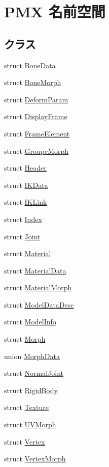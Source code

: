 \hypertarget{namespace_p_m_x}{}\section{P\+MX 名前空間}
\label{namespace_p_m_x}
\subsection*{クラス}
\begin{DoxyCompactItemize}
\item 
struct \mbox{\hyperlink{struct_p_m_x_1_1_bone_data}{Bone\+Data}}
\item 
struct \mbox{\hyperlink{struct_p_m_x_1_1_bone_morph}{Bone\+Morph}}
\item 
struct \mbox{\hyperlink{struct_p_m_x_1_1_deform_param}{Deform\+Param}}
\item 
struct \mbox{\hyperlink{struct_p_m_x_1_1_display_frame}{Display\+Frame}}
\item 
struct \mbox{\hyperlink{struct_p_m_x_1_1_frame_element}{Frame\+Element}}
\item 
struct \mbox{\hyperlink{struct_p_m_x_1_1_groupe_morph}{Groupe\+Morph}}
\item 
struct \mbox{\hyperlink{struct_p_m_x_1_1_header}{Header}}
\item 
struct \mbox{\hyperlink{struct_p_m_x_1_1_i_k_data}{I\+K\+Data}}
\item 
struct \mbox{\hyperlink{struct_p_m_x_1_1_i_k_link}{I\+K\+Link}}
\item 
struct \mbox{\hyperlink{struct_p_m_x_1_1_index}{Index}}
\item 
struct \mbox{\hyperlink{struct_p_m_x_1_1_joint}{Joint}}
\item 
struct \mbox{\hyperlink{struct_p_m_x_1_1_material}{Material}}
\item 
struct \mbox{\hyperlink{struct_p_m_x_1_1_material_data}{Material\+Data}}
\item 
struct \mbox{\hyperlink{struct_p_m_x_1_1_material_morph}{Material\+Morph}}
\item 
struct \mbox{\hyperlink{struct_p_m_x_1_1_model_data_desc}{Model\+Data\+Desc}}
\item 
struct \mbox{\hyperlink{struct_p_m_x_1_1_model_info}{Model\+Info}}
\item 
struct \mbox{\hyperlink{struct_p_m_x_1_1_morph}{Morph}}
\item 
union \mbox{\hyperlink{union_p_m_x_1_1_morph_data}{Morph\+Data}}
\item 
struct \mbox{\hyperlink{struct_p_m_x_1_1_normal_joint}{Normal\+Joint}}
\item 
struct \mbox{\hyperlink{struct_p_m_x_1_1_rigid_body}{Rigid\+Body}}
\item 
struct \mbox{\hyperlink{struct_p_m_x_1_1_texture}{Texture}}
\item 
struct \mbox{\hyperlink{struct_p_m_x_1_1_u_v_morph}{U\+V\+Morph}}
\item 
struct \mbox{\hyperlink{struct_p_m_x_1_1_vertex}{Vertex}}
\item 
struct \mbox{\hyperlink{struct_p_m_x_1_1_vertex_morph}{Vertex\+Morph}}
\end{DoxyCompactItemize}
